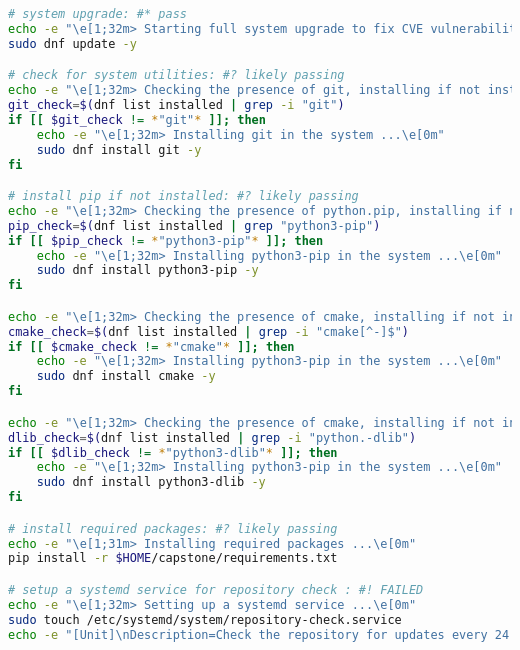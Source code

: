 \documentclass[12pt]{article}
\begin{document}
\singlespacing
\begin{lstlisting}[language=bash, caption={\texttt{pre\_setup.sh} for system setup on \texttt{rpm}-based Linux distributions.}]
# system upgrade: #* pass
echo -e "\e[1;32m> Starting full system upgrade to fix CVE vulnerabilities ...\e[0m\nKindly input the current password : 'root' (no quotations) when prompted, and don't let the system die."
sudo dnf update -y

# check for system utilities: #? likely passing    
echo -e "\e[1;32m> Checking the presence of git, installing if not installed ...\e[0m"    
git_check=$(dnf list installed | grep -i "git")
if [[ $git_check != *"git"* ]]; then
	echo -e "\e[1;32m> Installing git in the system ...\e[0m"
	sudo dnf install git -y
fi

# install pip if not installed: #? likely passing
echo -e "\e[1;32m> Checking the presence of python.pip, installing if not installed ...\e[0m"
pip_check=$(dnf list installed | grep "python3-pip")
if [[ $pip_check != *"python3-pip"* ]]; then
	echo -e "\e[1;32m> Installing python3-pip in the system ...\e[0m"
	sudo dnf install python3-pip -y
fi

echo -e "\e[1;32m> Checking the presence of cmake, installing if not installed ...\e[0m"
cmake_check=$(dnf list installed | grep -i "cmake[^-]$")
if [[ $cmake_check != *"cmake"* ]]; then
	echo -e "\e[1;32m> Installing python3-pip in the system ...\e[0m"
	sudo dnf install cmake -y
fi

echo -e "\e[1;32m> Checking the presence of cmake, installing if not installed ...\e[0m"
dlib_check=$(dnf list installed | grep -i "python.-dlib")
if [[ $dlib_check != *"python3-dlib"* ]]; then
	echo -e "\e[1;32m> Installing python3-pip in the system ...\e[0m"
	sudo dnf install python3-dlib -y
fi

# install required packages: #? likely passing
echo -e "\e[1;31m> Installing required packages ...\e[0m"
pip install -r $HOME/capstone/requirements.txt

# setup a systemd service for repository check : #! FAILED
echo -e "\e[1;32m> Setting up a systemd service ...\e[0m"
sudo touch /etc/systemd/system/repository-check.service
echo -e "[Unit]\nDescription=Check the repository for updates every 24 hours.\nAfter=network.target\nStartLimitIntervalSec=5\n\n[Service]\nType=simple\nRestart=always\nRestartSec=5\nUser=\"%u\"\nExecStart=/usr/bin/env python \"%h\"/repository/bin/service.py'\n\n[Install]\nWantedBy=multi-user.target" | sudo tee -a /etc/systemd/system/repository-check.service


\end{lstlisting}
\end{document}
